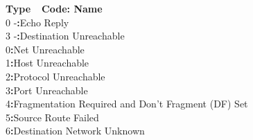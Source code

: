 \documentclass[a4paper,12pt]{article}
\begin{document}
\begin{figure}[H]
			\textbf{Type~\textbar~Code: Name}\\
			\hspace{8.7mm}0 \hspace{2mm}			-\hspace{8.9mm}\textbf{:}\hspace{2.4mm}Echo Reply\\
			\iffalse 
			\hspace{8.7mm}3 \hspace{2mm}			-\hspace{9mm}\textbf{:}\hspace{2.2mm}Destination Unreachable\\
			\hspace{8.7mm} \hspace{3.6mm}			0\hspace{8.8mm}\textbf{:}\hspace{2.2mm}Net Unreachable\\
			\hspace{8.7mm} \hspace{3.6mm}			1\hspace{8.8mm}\textbf{:}\hspace{2.2mm}Host Unreachable\\
			\hspace{8.7mm} \hspace{3.6mm}			2\hspace{8.8mm}\textbf{:}\hspace{2.2mm}Protocol Unreachable\\
			\hspace{8.7mm} \hspace{3.6mm}			3\hspace{8.8mm}\textbf{:}\hspace{2.2mm}Port Unreachable\\
			\hspace{8.7mm} \hspace{3.6mm}			4\hspace{8.8mm}\textbf{:}\hspace{2.2mm}Fragmentation Required and Don't Fragment (DF) Set\\
			\hspace{8.7mm} \hspace{3.6mm}			5\hspace{8.8mm}\textbf{:}\hspace{2.2mm}Source Route Failed\\
			\hspace{8.7mm} \hspace{3.6mm}			6\hspace{8.8mm}\textbf{:}\hspace{2.2mm}Destination Network Unknown\\

\end{figure}
\end{document}

